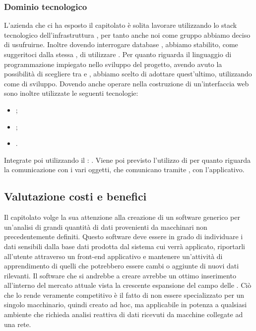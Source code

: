  
\subsubsection{Dominio tecnologico}
L'azienda \Proponente{} che ci ha esposto il capitolato \ProjectName{} \`e solita lavorare utilizzando lo stack tecnologico dell'infrastruttura , per tanto anche noi come gruppo abbiamo deciso di usufruirne.
Inoltre dovendo interrogare database , abbiamo stabilito, come suggeritoci dalla stessa \Proponente{}, di utilizzare .
Per quanto riguarda il linguaggio di programmazione impiegato nello sviluppo del progetto, avendo avuto la possibilit\`a di scegliere tra  e , abbiamo scelto di adottare quest'ultimo, utilizzando  come  di sviluppo.
Dovendo anche operare nella costruzione di un'interfaccia web sono inoltre utilizzate le seguenti tecnologie:
\begin{itemize}
	\item \textbf{};
	\item\textbf{};
	\item \textbf{}.
\end{itemize}
Integrate poi utilizzando il : .
Viene poi previsto l'utilizzo di  per quanto riguarda la comunicazione con i vari oggetti, che comunicano tramite , con l'applicativo.

\subsection{Valutazione costi e benefici}
Il capitolato volge la sua attenzione alla creazione di un software generico per un'analisi di grandi quantit\`a di dati provenienti da macchinari non precedentemente definiti. Questo software deve essere in grado di individuare i dati sensibili dalla base dati prodotta dal sistema cui verr\`a applicato, riportarli all'utente attraverso un front-end applicativo e mantenere un'attivit\`a di apprendimento di quelli che potrebbero essere cambi o aggiunte di nuovi dati rilevanti. Il software che si andrebbe a creare avrebbe un ottimo inserimento all'interno del mercato attuale vista la crescente espansione del campo delle . Ci\`o che lo rende veramente competitivo \`e il fatto di non essere specializzato per un singolo macchinario, quindi creato ad hoc, ma applicabile in potenza a qualsiasi ambiente che richieda analisi reattiva di dati ricevuti da macchine collegate ad una rete.
